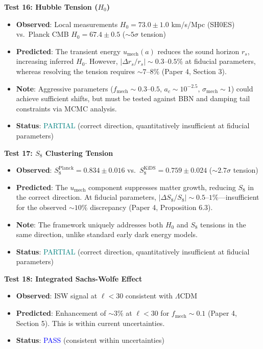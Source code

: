 \documentclass[11pt,a4paper]{article}
\newcommand{\umech}{\ensuremath{u_{\mathrm{mech}}}}
\theoremstyle{definition}
\theoremstyle{remark}
\begin{document}
\textbf{Test 16: Hubble Tension ($H_0$)}

\begin{itemize}[leftmargin=*, itemsep=0.1em]
\item \textbf{Observed}: Local measurements $H_0 = 73.0 \pm 1.0$ km/s/Mpc (SH0ES) vs.\ Planck CMB $H_0 = 67.4 \pm 0.5$ ($\sim 5\sigma$ tension)
\item \textbf{Predicted}: The transient energy $\umech(a)$ reduces the sound horizon $r_s$, increasing inferred $H_0$. However, $|\Delta r_s/r_s| \sim 0.3$--$0.5\%$ at fiducial parameters, whereas resolving the tension requires $\sim 7$--$8\%$ (Paper 4, Section 3).
\item \textbf{Note}: Aggressive parameters ($f_{\mathrm{mech}} \sim 0.3$--$0.5$, $a_c \sim 10^{-2.5}$, $\sigma_{\mathrm{mech}} \sim 1$) could achieve sufficient shifts, but must be tested against BBN and damping tail constraints via MCMC analysis.
\item \textbf{Status}: \textcolor{teal}{PARTIAL} (correct direction, quantitatively insufficient at fiducial parameters)
\end{itemize}

\textbf{Test 17: $S_8$ Clustering Tension}

\begin{itemize}[leftmargin=*, itemsep=0.1em]
\item \textbf{Observed}: $S_8^{\mathrm{Planck}} = 0.834 \pm 0.016$ vs.\ $S_8^{\mathrm{KiDS}} = 0.759 \pm 0.024$ ($\sim 2.7\sigma$ tension)
\item \textbf{Predicted}: The $\umech$ component suppresses matter growth, reducing $S_8$ in the correct direction. At fiducial parameters, $|\Delta S_8/S_8| \sim 0.5$--$1\%$---insufficient for the observed $\sim 10\%$ discrepancy (Paper 4, Proposition 6.3).
\item \textbf{Note}: The framework uniquely addresses both $H_0$ and $S_8$ tensions in the same direction, unlike standard early dark energy models.
\item \textbf{Status}: \textcolor{teal}{PARTIAL} (correct direction, quantitatively insufficient at fiducial parameters)
\end{itemize}

\textbf{Test 18: Integrated Sachs-Wolfe Effect}

\begin{itemize}[leftmargin=*, itemsep=0.1em]
\item \textbf{Observed}: ISW signal at $\ell < 30$ consistent with $\Lambda$CDM
\item \textbf{Predicted}: Enhancement of $\sim 3\%$ at $\ell < 30$ for $f_{\mathrm{mech}} \sim 0.1$ (Paper 4, Section 5). This is within current uncertainties.
\item \textbf{Status}: \textcolor{blue}{PASS} (consistent within uncertainties)
\end{itemize}
\end{document}
